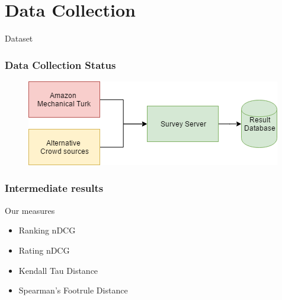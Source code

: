 \section{Data Collection}

\begin{frame}
     \begin{center}
     	\huge Dataset
     \end{center}
\end{frame}

\begin{frame}
\frametitle{Data Collection Status}
\begin{figure}
	\centering
	\includegraphics[scale=.5]{graphics/surveystatus.png}
\end{figure}
\end{frame}

\begin{frame}
\frametitle{Intermediate results}
Our measures
	\begin{itemize}
		\item Ranking nDCG
		\item Rating nDCG
		\item Kendall Tau Distance
		\item Spearman's Footrule Distance
	\end{itemize}
\end{frame}

